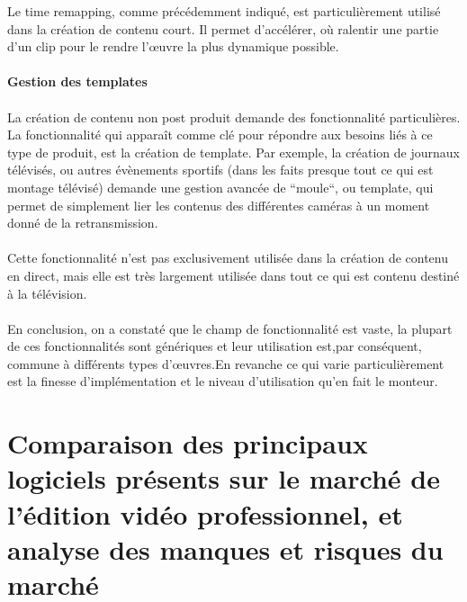 Le time remapping, comme précédemment indiqué, est particulièrement
utilisé dans la création de contenu court. Il permet d'accélérer,
où ralentir une partie d'un clip pour le rendre l'œuvre la plus
dynamique possible.

\paragraph{Gestion des templates}

\paragraph{ }

La création de contenu non post produit demande des fonctionnalité
particulières. La fonctionnalité qui apparaît comme clé pour répondre
aux besoins liés à ce type de produit, est la création de template. Par
exemple, la création de journaux télévisés, ou autres évènements
sportifs (dans les faits presque tout ce qui est montage télévisé)
demande une gestion avancée de ``moule``, ou template, qui permet de
simplement lier les contenus des différentes caméras à un moment
donné de la retransmission.

\paragraph{ }

Cette fonctionnalité n'est pas exclusivement utilisée dans la création
de contenu en direct, mais elle est très largement utilisée dans tout
ce qui est contenu destiné à la télévision.

\paragraph{} \paragraph{}

En conclusion, on a constaté que le champ de fonctionnalité est vaste,
la plupart de ces fonctionnalités sont génériques et leur utilisation
est,par conséquent, commune à différents types d'œuvres.En revanche
ce qui varie particulièrement  est la finesse d'implémentation et le
niveau d'utilisation qu'en fait le monteur.

\newpage \section{Comparaison des principaux logiciels présents sur le
marché de
  l'édition vidéo professionnel, et analyse des manques et risques
  du marché}

